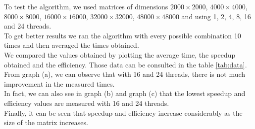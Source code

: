\documentclass{article}
\begin{document}
To test the algorithm, we used matrices of dimensions $2000\times2000$, $4000\times4000$, $8000\times8000$, $16000\times16000$, $32000\times32000$, $48000\times48000$ and using 1, 2, 4, 8, 16 and 24 threads. \\
To get better results we ran the algorithm with every possible combination 10 times and then averaged the times obtained. \\
We compared the values obtained by plotting the average time, the speedup obtained and the efficiency. Those data can be consulted in the table \ref{tab:data}.
\\
From graph (a), we can observe that with 16 and 24 threads, there is not much improvement in the measured times. \\
In fact, we can also see in  graph (b) and graph (c) that the lowest speedup and efficiency values are measured with 16 and 24 threads. \\
Finally, it can be seen that speedup and efficiency increase considerably as the size of the matrix increases. 
\begin{figure}[H]
      \centering
      \label{img:time}
      \qquad
      \label{img:speedup}
      \qquad
      \label{img:efficiency}
  \label{fig:fig1}
\end{figure}
\end{document}
